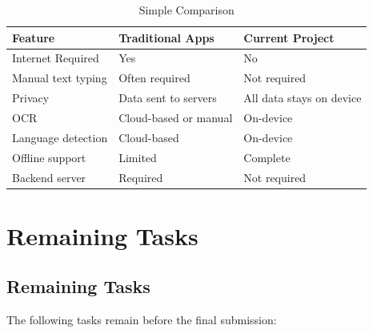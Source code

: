 \documentclass[12pt,a4paper]{report}
\begin{document}
\begin{table}[H]
\centering
\caption{Simple Comparison}
\begin{tabular}{|p{4cm}|p{4cm}|p{4cm}|}
\hline
\textbf{Feature} & \textbf{Traditional Apps} & \textbf{Current Project} \\ \hline
Internet Required & Yes & No \\ \hline
Manual text typing & Often required & Not required \\ \hline
Privacy & Data sent to servers & All data stays on device \\ \hline
OCR & Cloud-based or manual & On-device \\ \hline
Language detection & Cloud-based & On-device \\ \hline
Offline support & Limited & Complete \\ \hline
Backend server & Required & Not required \\ \hline
\end{tabular}
\end{table}


\chapter{Remaining Tasks}

\section{Remaining Tasks}

The following tasks remain before the final submission:
\end{document}
